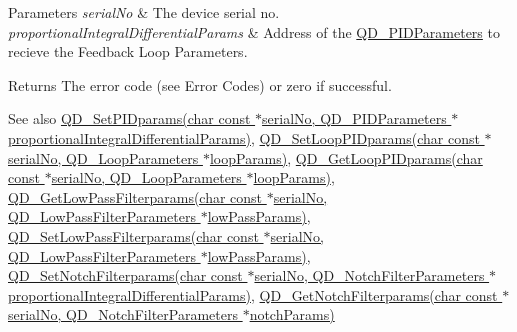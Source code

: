\begin{DoxyParams}{Parameters}
{\em serial\+No} & The device serial no. \\
\hline
{\em proportional\+Integral\+Differential\+Params} & Address of the \hyperlink{struct_q_d___p_i_d_parameters}{Q\+D\+\_\+\+P\+I\+D\+Parameters} to recieve the Feedback Loop Parameters. \\
\hline
\end{DoxyParams}
\begin{DoxyReturn}{Returns}
The error code (see Error Codes) or zero if successful. 
\end{DoxyReturn}
\begin{DoxySeeAlso}{See also}
\hyperlink{group___t_cube_quad_gac4cc242d12537c25f48b86e73138c3d1}{Q\+D\+\_\+\+Set\+P\+I\+Dparams(char const $\ast$serial\+No, Q\+D\+\_\+\+P\+I\+D\+Parameters $\ast$proportional\+Integral\+Differential\+Params)}, \hyperlink{group___t_cube_quad_gad75ed2cff04b2d218326841b2553af0a}{Q\+D\+\_\+\+Set\+Loop\+P\+I\+Dparams(char const $\ast$serial\+No, Q\+D\+\_\+\+Loop\+Parameters $\ast$loop\+Params)}, \hyperlink{group___t_cube_quad_ga9dfc01ca4b37b2f0c662b8d8def06e73}{Q\+D\+\_\+\+Get\+Loop\+P\+I\+Dparams(char const $\ast$serial\+No, Q\+D\+\_\+\+Loop\+Parameters $\ast$loop\+Params)}, \hyperlink{group___t_cube_quad_ga698c72e36ea50417955b08b69215fcf5}{Q\+D\+\_\+\+Get\+Low\+Pass\+Filterparams(char const $\ast$serial\+No, Q\+D\+\_\+\+Low\+Pass\+Filter\+Parameters $\ast$low\+Pass\+Params)}, \hyperlink{group___t_cube_quad_ga2e8b2f659d9008af335d876976450bc5}{Q\+D\+\_\+\+Set\+Low\+Pass\+Filterparams(char const $\ast$serial\+No, Q\+D\+\_\+\+Low\+Pass\+Filter\+Parameters $\ast$low\+Pass\+Params)}, \hyperlink{group___t_cube_quad_ga00572c166108d5bd60ed0ab5eae7d83c}{Q\+D\+\_\+\+Set\+Notch\+Filterparams(char const $\ast$serial\+No, Q\+D\+\_\+\+Notch\+Filter\+Parameters $\ast$proportional\+Integral\+Differential\+Params)}, \hyperlink{group___t_cube_quad_ga5132ce023e2c0248a42cb5cdf0a95c3e}{Q\+D\+\_\+\+Get\+Notch\+Filterparams(char const $\ast$serial\+No, Q\+D\+\_\+\+Notch\+Filter\+Parameters $\ast$notch\+Params)}


\end{DoxySeeAlso}
